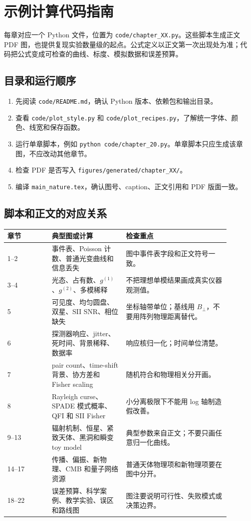 \chapter{示例计算代码指南}
\label{app:e}

每章对应一个 Python 文件，位置为 \texttt{code/chapter\_XX.py}。这些脚本生成正文 PDF 图，也提供复现实验数量级的起点。公式定义以正文第一次出现处为准；代码把公式变成可检查的曲线、标度、模拟数据和误差预算。

\section{目录和运行顺序}
\label{appsec:e-run}

\begin{enumerate}[leftmargin=*]
\item 先阅读 \texttt{code/README.md}，确认 Python 版本、依赖包和输出目录。
\item 查看 \texttt{code/plot\_style.py} 和 \texttt{code/plot\_recipes.py}，了解统一字体、颜色、线宽和保存函数。
\item 运行单章脚本，例如 \texttt{python code/chapter\_20.py}。单章脚本只应生成该章图，不应改动其他章节。
\item 检查 PDF 是否写入 \texttt{figures/generated/chapter\_XX/}。
\item 编译 \texttt{main\_nature.tex}，确认图号、caption、正文引用和 PDF 版面一致。
\end{enumerate}

\section{脚本和正文的对应关系}
\label{appsec:e-map}

\begin{longtable}{p{0.18\linewidth}p{0.30\linewidth}p{0.42\linewidth}}
\toprule
章节 & 典型图或计算 & 检查重点 \\
\midrule
1--2 & 事件表、Poisson 计数、普通光变曲线和信息丢失 & 图中事件表字段和正文符号一致。 \\
3--4 & 光态、占有数、\(g^{(1)}\)、\(g^{(2)}\)、多模稀释 & 不把理想单模结果画成真实仪器观测值。 \\
5 & 可见度、均匀圆盘、双星、SII SNR、相位缺失 & 坐标轴带单位；基线用 \(B_\perp\)，不要用阵列物理距离替代。 \\
6 & 探测器响应、jitter、死时间、背景稀释、数据率 & 响应核归一化；时间单位清楚。 \\
7 & pair count、time-shift 背景、协方差和 Fisher scaling & 随机符合和物理相关分开画。 \\
8 & Rayleigh curse、SPADE 模式概率、QFI 和 SII Fisher & 小分离极限下不能用 log 轴制造假改善。 \\
9--13 & 辐射机制、恒星、紧致天体、黑洞和瞬变 toy model & 典型参数来自正文；不要只画任意归一化曲线。 \\
14--17 & 传播、偏振、新物理、CMB 和量子网络资源 & 普通天体物理项和新物理项要在图中分开。 \\
18--22 & 误差预算、科学案例、教学实验、误区和路线图 & 图注要说明可行性、失败模式或决策边界。 \\
\bottomrule
\end{longtable}

